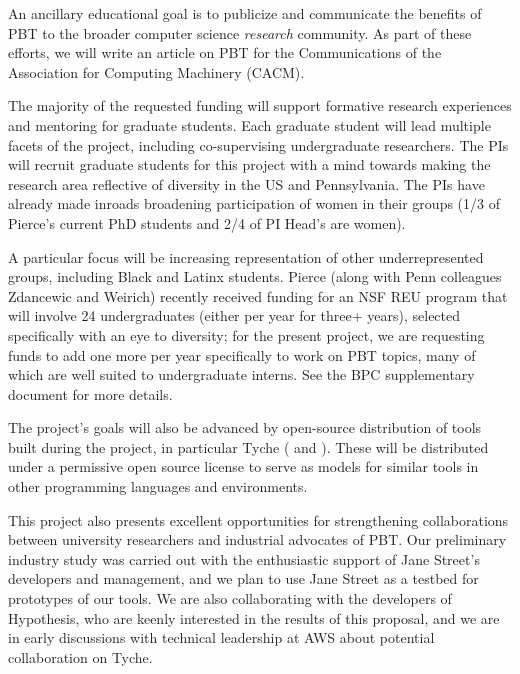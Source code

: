 {An ancillary educational goal is to
publicize and communicate the benefits of PBT to the broader computer science
{\em research} community. As part of these efforts, we will write an article on PBT
for the Communications of the Association for Computing Machinery
(CACM).

\smallskip
{}
%
The majority of the requested funding will support formative research
experiences and mentoring for graduate students. Each graduate
student will lead multiple facets of the
project, including co-supervising undergraduate
researchers.
%
The PIs will recruit graduate students for this project with a mind towards making
the research area reflective of diversity in the US and Pennsylvania.
The PIs have already made inroads broadening participation of women in their
groups (1/3 of Pierce's current PhD students and 2/4 of PI
Head's are women).

A particular focus
will be increasing representation of
other underrepresented groups, including Black and Latinx
students. Pierce (along with Penn colleagues Zdancewic and Weirich)
recently received funding for an
NSF REU program that will involve 24 undergraduates (either per
year for three+ years), selected specifically with an eye to diversity;
for the present project, we are requesting funds to add one more per
year specifically to work on PBT topics, many of which are well suited
to undergraduate interns. See the BPC
supplementary
document for more details.

\smallskip
{}
%
The project's goals will also be advanced by open-source distribution of tools
built during the project, in particular Tyche
( and
). These will be distributed under a permissive
open source license to serve as models for similar tools in other
programming languages and environments.

This project also presents excellent opportunities for strengthening
collaborations between university researchers and industrial advocates
of PBT.  Our preliminary industry study was carried out with the
enthusiastic support of Jane Street's developers and management, and we plan
to use Jane Street as a testbed for prototypes of our
tools.  We are also collaborating with the
developers of Hypothesis, who are keenly
interested in the results of this proposal, and we are in early
discussions with technical leadership at AWS about potential
collaboration on Tyche.  

}
